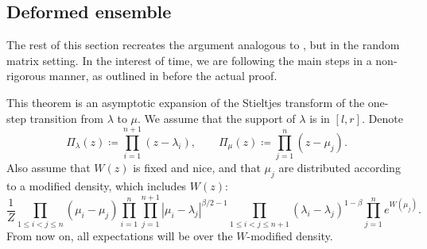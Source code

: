 \documentclass[letterpaper,11pt,oneside,reqno]{article}
\numberwithin{equation}{section}
\newcommand{\ssp}{\hspace{1pt}}
\theoremstyle{definition}
\begin{document}
%
%
%
\subsection{Deformed ensemble}

The rest of this section recreates the argument analogous to 
\cite[Theorem~4.5]{gorin2022dynamical},
but in the random matrix setting.
In the interest of time, we are following the main steps in a non-rigorous manner,
as outlined in \cite[Section~4.2]{gorin2022dynamical} before the actual proof.

This theorem is an asymptotic expansion of the Stieltjes transform
of the one-step transition from $\lambda$ to $\mu$.
We assume that the support of $\lambda$ is in $[l,r]$.
Denote 
\begin{equation*}
	\Pi_\lambda(z)\coloneqq \prod_{i=1}^{n+1}(z-\lambda_i),\qquad 
	\Pi_\mu(z)\coloneqq \prod_{j=1}^{n}(z-\mu_j).
\end{equation*}
Also assume that $W(z)$ is fixed and nice, and that $\mu_j$ are 
distributed according to a modified 
density, which includes $W(z)$:
\begin{equation*}
	\frac{1}{Z}
		\prod_{1\le i<j\le n}(\mu_i-\mu_j)
		\prod_{i=1}^{n}\prod_{j=1}^{n+1} |\mu_i-\lambda_j|^{\beta/2-1}
		\prod_{1\le i<j\le n+1}(\lambda_i-\lambda_j)^{1-\beta}\prod_{j=1}^n e^{W(\mu_j)}.
\end{equation*}
From now on, all expectations will be over the $W$-modified density.
\end{document}

